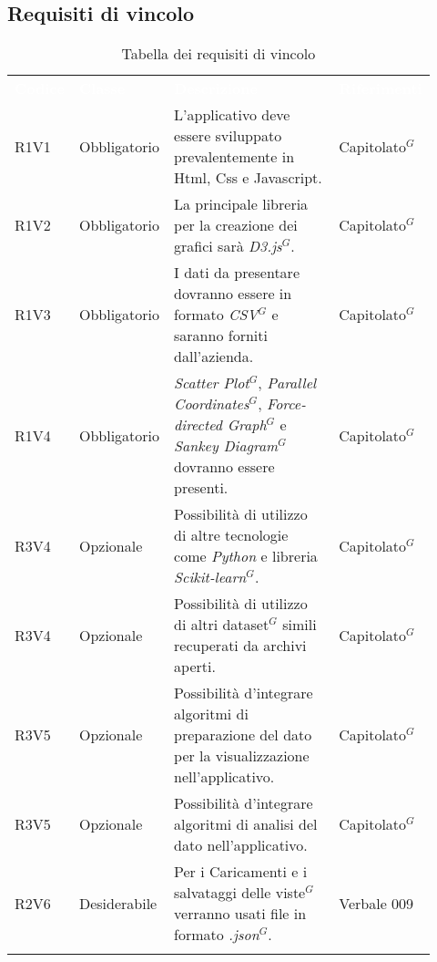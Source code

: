 \subsection{Requisiti di vincolo}
{\renewcommand{\arraystretch}{1.5}
\begin{longtable}{p{0.12\linewidth}p{0.15\linewidth}p{0.50\linewidth}p{0.15\linewidth}}
	\rowcolor[RGB]{33, 73, 50}
	\textcolor{white}{\textbf{Codice}} & \textcolor{white}{\textbf{Classe}} & \textcolor{white}{\textbf{Descrizione}} &
    \textcolor{white}{\textbf{Riferimenti}}\\
    
    \rowcolor[RGB]{216, 235, 171}
    R1V1 & Obbligatorio & L'applicativo deve essere sviluppato prevalentemente in Html, Css e Javascript. & Capitolato$^{G}$\\
    \rowcolor[RGB]{233, 245, 206}
    R1V2 & Obbligatorio & La principale libreria per la creazione dei grafici sarà \textit{D3.js}$^{G}$. & Capitolato$^{G}$\\
    \rowcolor[RGB]{216, 235, 171}
    R1V3 & Obbligatorio & I dati da presentare dovranno essere in formato \textit{CSV}$^{G}$ e saranno forniti dall'azienda.& Capitolato$^{G}$\\
    \rowcolor[RGB]{233, 245, 206}
    R1V4 & Obbligatorio & \textit{Scatter Plot}$^{G}$, \textit{Parallel Coordinates}$^{G}$, \textit{Force-directed Graph}$^{G}$ e \textit{Sankey Diagram}$^{G}$ dovranno essere presenti.& Capitolato$^{G}$\\
    \rowcolor[RGB]{216, 235, 171}
    R3V4 & Opzionale & Possibilità di utilizzo di altre tecnologie come \textit{Python} e libreria \textit{Scikit-learn}$^{G}$.& Capitolato$^{G}$\\
    \rowcolor[RGB]{233, 245, 206}
    R3V4 & Opzionale & Possibilità di utilizzo di altri dataset$^{G}$ simili recuperati da archivi aperti. & Capitolato$^{G}$ \\ 
    \rowcolor[RGB]{216, 235, 171}
    R3V5 & Opzionale & Possibilità d'integrare algoritmi di preparazione del dato per la visualizzazione nell'applicativo. & Capitolato$^{G}$\\
    \rowcolor[RGB]{233, 245, 206}
    R3V5 & Opzionale & Possibilità d'integrare algoritmi di analisi del dato nell'applicativo. & Capitolato$^{G}$\\
    \rowcolor[RGB]{216, 235, 171}
    R2V6 & Desiderabile & Per i Caricamenti e i salvataggi delle viste$^{G}$ verranno usati file in formato \textit{.json}$^{G}$. & Verbale 009\\
    
    \caption{Tabella dei requisiti di vincolo}
\end{longtable}	
}

